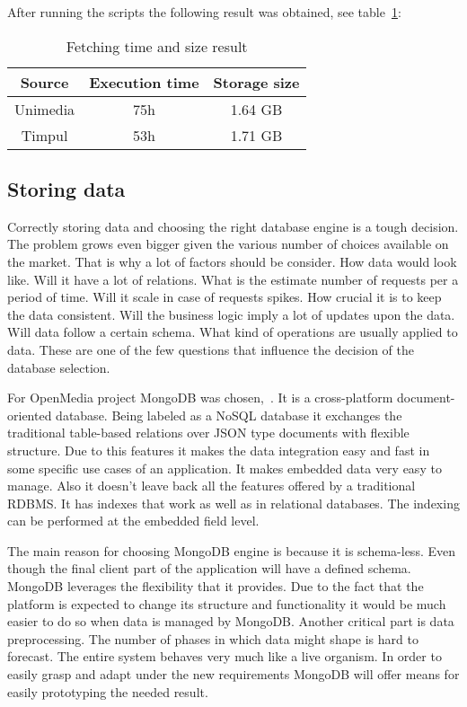 After running the scripts the following result was obtained, see \mbox{table \ref{fetcher_result}}:
\begin{table}[!h]
  \begin{center}
    \caption{Fetching time and size result}
    \begin{tabular}{|c c c |}
      \hline
        Source & Execution time & Storage size \\ [0.5ex] 
      \hline
        Unimedia & 75h & 1.64 GB \\
      \hline
        Timpul & 53h & 1.71 GB \\
      \hline
    \end{tabular}
    \label{fetcher_result}
  \end{center}
  \vspace{-2.5em}
\end{table}

\subsection{Storing data}
Correctly storing data and choosing the right database engine is a tough decision. The problem grows even bigger given the various number of choices available on the market. That is why a lot of factors should be consider. How data would look like. Will it have a lot of relations. What is the estimate number of requests per a period of time. Will it scale in case of requests spikes. How crucial it is to keep the data consistent. Will the business logic imply a lot of updates upon the data. Will data follow a certain schema. What kind of operations are usually applied to data. These are one of the few questions that influence the decision of the database selection.

For OpenMedia project MongoDB was \mbox{chosen, \cite{mongodb}}. It is a cross-platform document-oriented database. Being labeled as a NoSQL database it exchanges the traditional table-based relations over JSON type documents with flexible structure. Due to this features it makes the data integration easy and fast in some specific use cases of an application. It makes embedded data very easy to manage. Also it doesn't leave back all the features offered by a traditional RDBMS. It has indexes that work as well as in relational databases. The indexing can be performed at the embedded field level.

The main reason for choosing MongoDB engine is because it is schema-less. Even though the final client part of the application will have a defined schema. MongoDB leverages the flexibility that it provides. Due to the fact that the platform is expected to change its structure and functionality it would be much easier to do so when data is managed by MongoDB. Another critical part is data preprocessing. The number of phases in which data might shape is hard to forecast. The entire system behaves very much like a live organism. In order to easily grasp and adapt under the new requirements MongoDB will offer means for easily prototyping the needed result.

